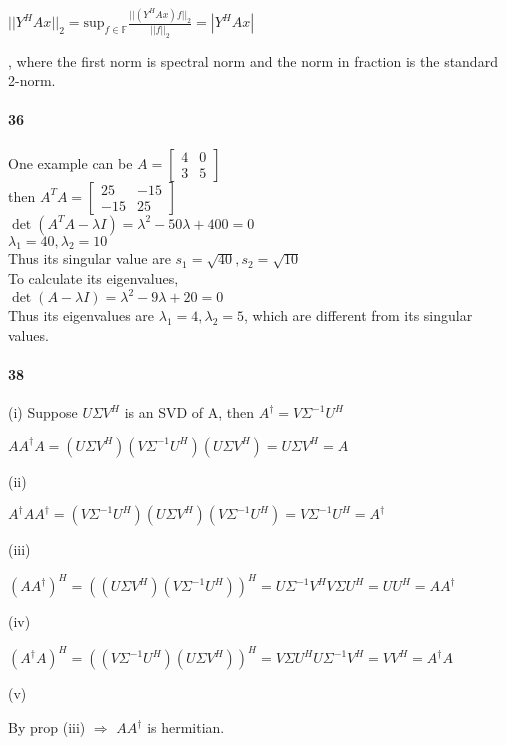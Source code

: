 \documentclass[10pt,letter]{article}
\begin{document}
$||Y^{H}Ax ||_{2} = \text{sup}_{f \in \mathbb{F}}\frac{||(Y^{H}Ax)f||_{2}}{||f||_{2}} = |Y^{H}Ax|$

, where the first norm is spectral norm and the norm in fraction is the standard 2-norm.

\paragraph{36}
One example can be  $A=\begin{bmatrix}
4&0\\3&5
\end{bmatrix}$\\
then $A^TA=\begin{bmatrix}
25&-15\\-15&25
\end{bmatrix}$\\
$\det(A^TA-\lambda I)=\lambda^2-50\lambda+400=0$\\
$\lambda_1=40, \lambda_2=10$\\
Thus its singular value are $s_1=\sqrt{40}, s_2=\sqrt{10}$\\
To calculate its eigenvalues, \\
$\det(A-\lambda I)=\lambda^2-9\lambda+20=0$\\
Thus its eigenvalues are $\lambda_1=4,\lambda_2=5$, which are different from its singular values. 
\paragraph{38}

(i) Suppose $U \Sigma V^{H}$ is an SVD of A, then $A^\dagger = V \Sigma^{-1} U^H$

$
AA^\dagger A = (U \Sigma V^H) (V \Sigma^{-1} U^H) (U \Sigma V^H) = U \Sigma V^H = A
$

\noindent (ii) 

$A^\dagger A A^\dagger = (V \Sigma^{-1} U^H) (U \Sigma V^H) (V \Sigma^{-1} U^H) = V \Sigma^{-1} U^H = A^\dagger $

\noindent (iii) 

$
(AA^\dagger)^H = ((U \Sigma V^H) (V \Sigma^{-1} U^H))^H = U \Sigma^{-1}V^H V \Sigma U^H = UU^H = AA^\dagger
$

\noindent (iv)

$
(A^\dagger A)^H = ((V \Sigma^{-1} U^H) (U \Sigma V^H))^H = V \Sigma U^H U \Sigma^{-1} V^H = VV^H = A^\dagger A
$

\noindent (v)

By prop (iii) $\Rightarrow$ $A A^\dagger$ is hermitian. 
\end{document}
